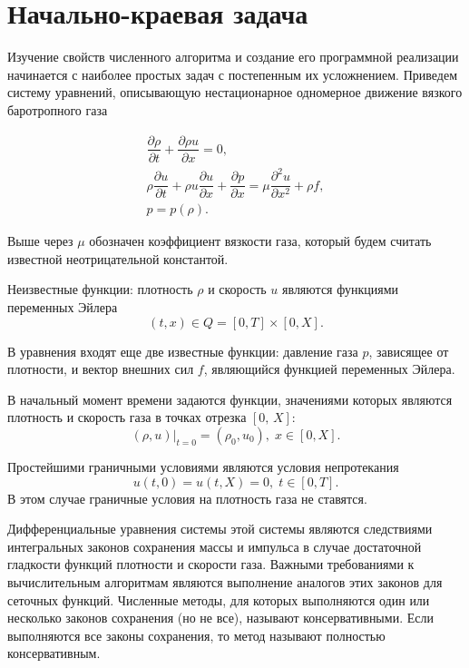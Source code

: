 \documentclass[a4paper,11pt]{article}
\begin{document}
\section{Начально-краевая задача}
\label{dif}

Изучение свойств численного алгоритма и создание его программной реализации
начинается с наиболее простых задач с постепенным их усложнением.
Приведем систему уравнений, описывающую нестационарное
одномерное движение вязкого баротропного газа

\begin{equation}
\begin{array}{l}
\dfrac{\partial\rho}{\partial t} + \dfrac{\partial\rho u}{\partial x} = 0, \\[2.0ex]
\rho\dfrac{\partial u}{\partial t} + \rho u\dfrac{\partial u}{\partial x}  +
\dfrac{\partial p}{\partial x} =\mu\dfrac{\partial^2 u}{\partial x^2}  + \rho f, \\[1.5ex]
p=p(\rho).
\end{array}
\label{onedim.1}
\end{equation}

Выше через $\mu$ обозначен коэффициент
вязкости газа, который будем считать
известной неотрицательной константой.

Неизвестные функции: плотность $\rho$  и  скорость $u$ являются
функциями переменных Эйлера
$$
(t,x) \in Q=[0,T]\times [0,X].
$$%

В уравнения входят еще две известные функции:
давление газа $p$,  зависящее от плотности, и вектор внешних сил $f$,
являющийся функцией переменных Эйлера.

В начальный момент времени задаются функции, значениями которых являются
плотность и скорость газа в точках отрезка $[0,\,X]$:
\begin{equation}
(\rho,u)|_{t=0} =(\rho_0,u_0),\;  x\in [0,X].
\label{onedim.2}
\end{equation}

Простейшими граничными условиями являются условия непротекания
\begin{equation}
u(t,0)=u(t,X)=0,\;  t\in [0,T].
\label{onedim.3}
\end{equation}
В этом случае граничные условия на плотность газа не ставятся.

Дифференциальные уравнения системы этой системы являются следствиями
интегральных законов сохранения массы и импульса в случае достаточной
гладкости функций плотности и скорости газа.
Важными требованиями к вычислительным алгоритмам являются выполнение аналогов
этих законов для сеточных функций. Численные методы, для которых выполняются
один или несколько законов сохранения (но не все), называют консервативными.
Если выполняются все законы сохранения, то метод называют полностью
консервативным.
\end{document}
